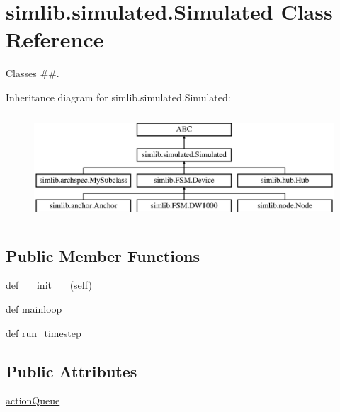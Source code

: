 \hypertarget{classsimlib_1_1simulated_1_1_simulated}{}\section{simlib.\+simulated.\+Simulated Class Reference}
\label{classsimlib_1_1simulated_1_1_simulated}


Classes \#\#.  


Inheritance diagram for simlib.\+simulated.\+Simulated\+:\begin{figure}[H]
\begin{center}
\leavevmode
\includegraphics[height=4.000000cm]{classsimlib_1_1simulated_1_1_simulated}
\end{center}
\end{figure}
\subsection*{Public Member Functions}
\begin{DoxyCompactItemize}
\item 
def \mbox{\hyperlink{classsimlib_1_1simulated_1_1_simulated_aeb8d4e3ec653925db07aa4a13f128b0b}{\+\_\+\+\_\+init\+\_\+\+\_\+}} (self)
\item 
def \mbox{\hyperlink{classsimlib_1_1simulated_1_1_simulated_aef913462bcf40e1a2515fdc6f84ef8a4}{mainloop}}
\item 
def \mbox{\hyperlink{classsimlib_1_1simulated_1_1_simulated_a33d6b8f120ac2a359c8ea9b4a293967d}{run\+\_\+timestep}}
\end{DoxyCompactItemize}
\subsection*{Public Attributes}
\begin{DoxyCompactItemize}
\item 
\mbox{\hyperlink{classsimlib_1_1simulated_1_1_simulated_ae6258c72199dbdda082683c39a7dc336}{action\+Queue}}
\end{DoxyCompactItemize}


